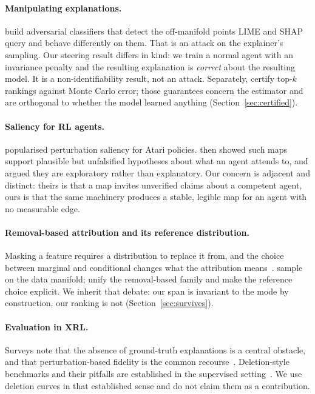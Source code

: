 \documentclass[10pt,twocolumn]{article}
\newcommand{\elsewhere}[1]{Section~\ref{#1}}
\begin{document}
\paragraph{Manipulating explanations.}
\citet{slack2020fooling} build adversarial classifiers that detect the
off-manifold points LIME and SHAP query and behave differently on them. That is
an attack on the explainer's sampling. Our steering result differs in kind: we
train a normal agent with an invariance penalty and the resulting explanation is
\emph{correct} about the resulting model. It is a non-identifiability result,
not an attack. Separately, \citet{goldwasser2024significance} certify top-$k$
rankings against Monte Carlo error; those guarantees concern the estimator and
are orthogonal to whether the model learned anything
(\elsewhere{sec:certified}).

\paragraph{Saliency for RL agents.}
\citet{greydanus2018visualizing} popularised perturbation saliency for Atari
policies. \citet{atrey2020exploratory} then showed such maps support plausible
but unfalsified hypotheses about what an agent attends to, and argued they are
exploratory rather than explanatory. Our concern is adjacent and distinct:
theirs is that a map invites unverified claims about a competent agent, ours is
that the same machinery produces a stable, legible map for an agent with no
measurable edge.

\paragraph{Removal-based attribution and its reference distribution.}
Masking a feature requires a distribution to replace it from, and the choice
between marginal and conditional changes what the attribution
means~\citep{chen2020true,janzing2020causal}. \citet{frye2021manifold} sample on
the data manifold; \citet{covert2021removing} unify the removal-based family and
make the reference choice explicit. We inherit that debate: our span is
invariant to the mode by construction, our ranking is not
(\elsewhere{sec:survives}).

\paragraph{Evaluation in XRL.}
Surveys note that the absence of ground-truth explanations is a central obstacle,
and that perturbation-based fidelity is the common
recourse~\citep{cheng2025survey,milani2024xrl}. Deletion-style benchmarks and
their pitfalls are established in the supervised
setting~\citep{hooker2019benchmark,yeh2019infidelity,bhatt2020evaluating}. We use
deletion curves in that established sense and do not claim them as a
contribution.
\end{document}
